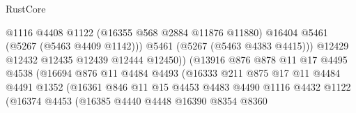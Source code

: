 \begin{lexlean}{RustCore}
\begin{coremodule}
                                            @1116
                                            @4408
                                            @1122
                                            (@16355 @568 @2884 @11876 @11880)
                                            @16404
                                            @5461
                                            (@5267 (@5463 @4409 @1142)))
                                          @5461
                                          (@5267 (@5463 @4383 @4415)))
                                        @12429
                                        @12432
                                        @12435
                                        @12439
                                        @12444
                                        @12450))
                                    (@13916
                                      @876
                                      @878
                                      @11
                                      @17
                                      @4495
                                      @4538
                                      (@16694
                                        @876
                                        @11
                                        @4484
                                        @4493
                                        (@16333
                                          @211
                                          @875
                                          @17
                                          @11
                                          @4484
                                          @4491
                                          @1352
                                          (@16361
                                            @846
                                            @11
                                            @15
                                            @4453
                                            @4483
                                            @4490
                                            @1116
                                            @4432
                                            @1122
                                            (@16374
                                              @4453
                                              (@16385
                                                @4440
                                                @4448
                                                @16390
                                                @8354
                                                @8360

\end{coremodule}
\end{lexlean}
